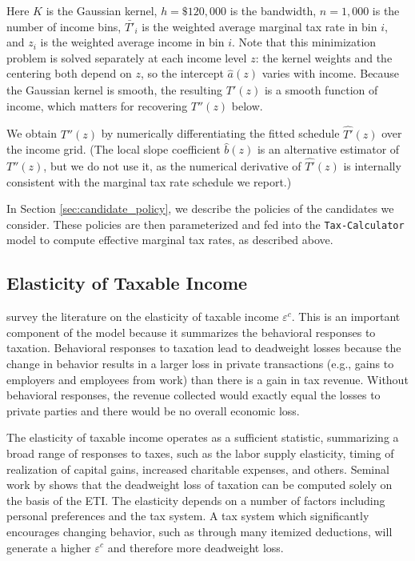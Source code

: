 \documentclass[12pt]{article}
\begin{document}
Here $K$ is the Gaussian kernel, $h = \$120{,}000$ is the bandwidth, $n = 1{,}000$ is the number of income bins, $\bar{T'}_i$ is the weighted average marginal tax rate in bin $i$, and $z_i$ is the weighted average income in bin $i$.  Note that this minimization problem is solved separately at each income level $z$: the kernel weights and the centering both depend on $z$, so the intercept $\hat{a}(z)$ varies with income.  Because the Gaussian kernel is smooth, the resulting $\hat{T'}(z)$ is a smooth function of income, which matters for recovering $T''(z)$ below.

We obtain $T''(z)$ by numerically differentiating the fitted schedule $\hat{T'}(z)$ over the income grid.  (The local slope coefficient $\hat{b}(z)$ is an alternative estimator of $T''(z)$, but we do not use it, as the numerical derivative of $\hat{T'}(z)$ is internally consistent with the marginal tax rate schedule we report.)

In Section \ref{sec:candidate_policy}, we describe the policies of the candidates we consider.  These policies are then parameterized and fed into the \texttt{Tax-Calculator} model to compute effective marginal tax rates, as described above.

\subsection{Elasticity of Taxable Income}\label{sec:ETI}

\citet{SSG2012} survey the literature on the elasticity of taxable income $\varepsilon^c$. This is an important component of the model because it summarizes the behavioral responses to taxation. Behavioral responses to taxation lead to deadweight losses because the change in behavior results in a larger loss in private transactions (e.g., gains to employers and employees from work) than there is a gain in tax revenue.  Without behavioral responses, the revenue collected would exactly equal the losses to private parties and there would be no overall economic loss.

The elasticity of taxable income operates as a sufficient statistic, summarizing a broad range of responses to taxes, such as the labor supply elasticity, timing of realization of capital gains, increased charitable expenses, and others. Seminal work by \citet{Feldstein1999} shows that the deadweight loss of taxation can be computed solely on the basis of the ETI. The elasticity depends on a number of factors including personal preferences and the tax system. A tax system which significantly encourages changing behavior, such as through many itemized deductions, will generate a higher $\varepsilon^c$ and therefore more deadweight loss.
\end{document}
